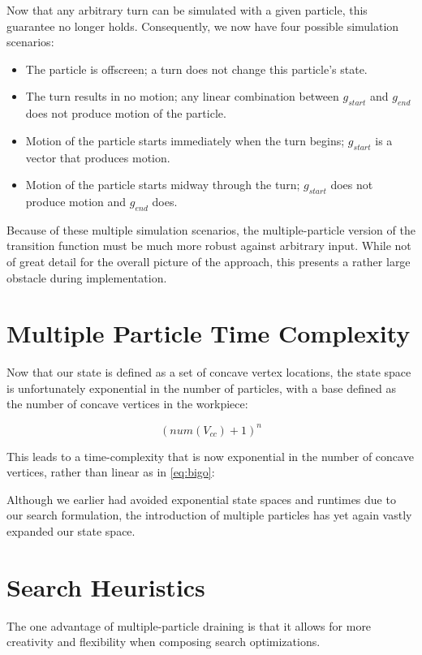 Now that any arbitrary turn can be simulated with a given particle, this guarantee no longer holds. Consequently, we now have four possible simulation scenarios:


\begin{itemize}
\item The particle is offscreen; a turn does not change this particle's state.
\item The turn results in no motion; any linear combination between $g_{start}$ and $g_{end}$ does not produce motion of the particle.
\item Motion of the particle starts immediately when the turn begins; $g_{start}$ is a vector that produces motion.
\item Motion of the particle starts midway through the turn; $g_{start}$ does not produce motion and $g_{end}$ does.
\end{itemize}

Because of these multiple simulation scenarios, the multiple-particle version of the transition function must be much more robust against arbitrary input. While not of great detail for the overall picture of the approach, this presents a rather large obstacle during implementation.

\section{Multiple Particle Time Complexity}

Now that our state is defined as a set of concave vertex locations, the state space is unfortunately exponential in the number of particles, with a base defined as the number of concave vertices in the workpiece:

$$
(num(V_{cc}) + 1)^n
$$

This leads to a time-complexity that is now exponential in the number of concave vertices, rather than linear as in \eqref{eq:bigo}:

 {
  \label{eq:bigoTotal}
}

Although we earlier had avoided exponential state spaces and runtimes due to our search formulation, the introduction of multiple particles has yet again vastly expanded our state space.

\section{Search Heuristics}

The one advantage of multiple-particle draining is that it allows for more creativity and flexibility when composing search optimizations.

